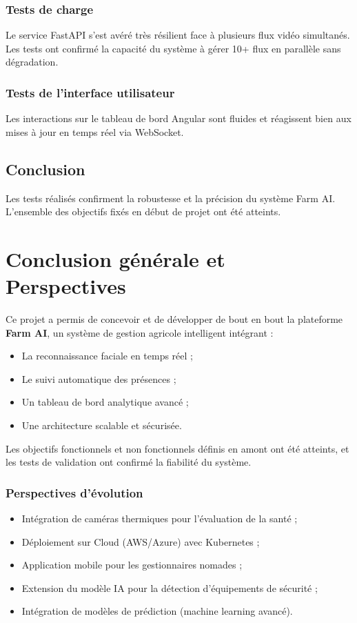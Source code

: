 \documentclass[12pt,a4paper]{report}
\numberwithin{figure}{chapter}
\numberwithin{table}{chapter}
\begin{document}
\subsection{Tests de charge}
Le service FastAPI s'est avéré très résilient face à plusieurs flux vidéo simultanés. Les tests
ont confirmé la capacité du système à gérer 10+ flux en parallèle sans dégradation.

\subsection{Tests de l'interface utilisateur}
Les interactions sur le tableau de bord Angular sont fluides et réagissent bien aux mises à jour
en temps réel via WebSocket.

\section{Conclusion}
Les tests réalisés confirment la robustesse et la précision du système Farm AI. L'ensemble des
objectifs fixés en début de projet ont été atteints.

\chapter*{Conclusion générale et Perspectives}

Ce projet a permis de concevoir et de développer de bout en bout la plateforme \textbf{Farm AI},
un système de gestion agricole intelligent intégrant :

\begin{itemize}
  \item La reconnaissance faciale en temps réel ;
  \item Le suivi automatique des présences ;
  \item Un tableau de bord analytique avancé ;
  \item Une architecture scalable et sécurisée.
\end{itemize}

Les objectifs fonctionnels et non fonctionnels définis en amont ont été atteints, et les tests
de validation ont confirmé la fiabilité du système.

\subsection*{Perspectives d'évolution}
\begin{itemize}
  \item Intégration de caméras thermiques pour l'évaluation de la santé ;
  \item Déploiement sur Cloud (AWS/Azure) avec Kubernetes ;
  \item Application mobile pour les gestionnaires nomades ;
  \item Extension du modèle IA pour la détection d'équipements de sécurité ;
  \item Intégration de modèles de prédiction (machine learning avancé).
\end{itemize}
\end{document}
